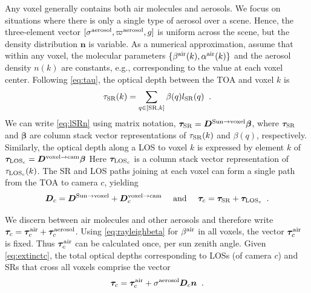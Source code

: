 \documentclass[10pt,letterpaper]{article}
\newcommand{\OpDistance}{\bm{D}}
\newcommand{\vect}[1]{\bm{#1}}
\begin{document}
Any voxel generally contains both air molecules and aerosols.
We focus on situations where there is only a single type of aerosol over a scene. Hence, the three-element vector
$[{\sigma}^{\rm aerosol},\varpi^{\rm aerosol},g]$ is uniform across
the scene, but the density distribution ${\bm n}$ is variable. As a numerical approximation,
assume that within any voxel, the molecular parameters $\{ \beta^{\rm
  air}(k),\alpha^{\rm air}(k)\}$ and the aerosol density $n(k)$ are constants, e.g., corresponding to the value
at each voxel center.  Following \cref{eq:tau}, the optical depth
between the TOA and voxel $k$ is
\begin{equation}
  \tau_{\rm SR}(k)= \sum_{q \in[{\rm SR},k]} \beta(q) l_{\rm SR}(q) \;\;.
  \label{eq:lSRn}
\end{equation}
We can write \cref{eq:lSRn} using matrix notation, $\vect{\tau}_{\rm
  SR}=\OpDistance^{\mathrm{Sun \rightarrow voxel}} \vect{\beta}$,
where $\vect{\tau}_{\rm SR}$ and $\vect{\beta}$ are column stack
vector representations of $\tau_{\rm SR}(k)$ and $\beta(q)$,
respectively. Similarly, the optical depth along a LOS to voxel $k$ is
expressed by element $k$ of $\vect{\tau}_{{\rm LOS}_c} =
\OpDistance^{\mathrm{voxel \rightarrow cam}} \vect{\beta}$ Here
$\vect{\tau}_{{\rm LOS}_c}$ is a column stack vector representation of
$\tau_{{\rm LOS}_c}(k)$.  The SR and LOS paths joining at each voxel
can form a single path from the TOA to camera $c$, yielding
\begin{equation}
  {\bm D}_c=
  {\bm D}^{\mathrm{Sun \rightarrow voxel}}+
  {\bm D}^{\mathrm{voxel \rightarrow cam}}_c
  \quad\text{ and }\quad
  \vect{\tau}_c=
  \vect{\tau}_{\rm SR}+
  \vect{\tau}_{{\rm LOS}_c}
  \;\;.
  \label{eq:D_tau_total}
\end{equation}

We discern between air molecules and other aerosols and therefore
write $ \vect{\tau}_c= \vect{\tau}_c^{\rm air} + \vect{\tau}_c^{\rm
  aerosol}$.  Using \cref{eq:rayleighbeta} for $\beta^{\rm air}$ in
all voxels, the vector $\vect{\tau}_c^{\rm air}$ is fixed. Thus
$\vect{\tau}_c^{\rm air}$ can be calculated once, per sun zenith
angle. Given \cref{eq:extinctc}, the total optical depths
corresponding to LOSs (of camera $c$) and SRs that cross all voxels
comprise the vector
\begin{equation}
  \vect{\tau}_c= \vect{\tau}_c^{\rm air}
  + \sigma^{\rm aerosol} {\bm D}_c {\bm n}
  \;\;.
  \label{eq:tautotal}
\end{equation}
\end{document}
